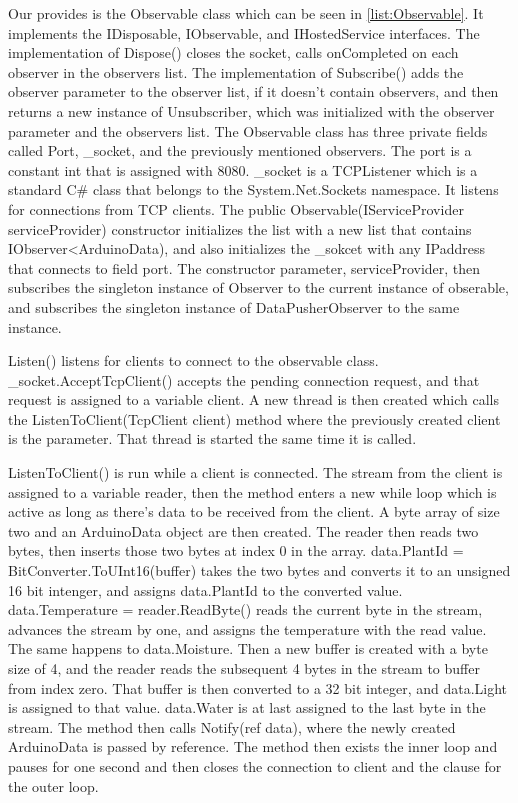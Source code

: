 \documentclass[a4paper,12pt,twoside,openright,titlepage]{book}
\begin{document}
Our provides is the Observable class which can be seen in \ref{list:Observable}. It implements the IDisposable, IObservable, and IHostedService interfaces. The implementation of Dispose() closes the socket, calls onCompleted on each observer in the observers list. The implementation of Subscribe() adds the observer parameter to the observer list, if it doesn't contain observers, and then returns a new instance of Unsubscriber, which was initialized with the observer parameter and the observers list. The Observable class has three private fields called Port, \_socket, and the previously mentioned observers. The port is a constant int that is assigned with 8080. \_socket is a TCPListener which is a standard C\# class that belongs to the System.Net.Sockets namespace. It listens for connections from TCP clients. The public Observable(IServiceProvider serviceProvider) constructor initializes the list with a new list that contains IObserver<ArduinoData), and also initializes the \_sokcet with any IPaddress that connects to field port. The constructor parameter, serviceProvider, then subscribes the singleton instance of Observer to the current instance of obserable, and subscribes the singleton instance of DataPusherObserver to the same instance.

Listen() listens for clients to connect to the observable class. \_socket.AcceptTcpClient() accepts the pending connection request, and that request is assigned to a variable client. A new thread is then created which calls the ListenToClient(TcpClient client) method where the previously created client is the parameter. That thread is started the same time it is called.

ListenToClient() is run while a client is connected. The stream from the client is assigned to a variable reader, then the method enters a new while loop which is active as long as there's data to be received from the client. A byte array of size two and an ArduinoData object are then created. The reader then reads two bytes, then inserts those two bytes at index 0 in the array. data.PlantId = BitConverter.ToUInt16(buffer) takes the two bytes and converts it to an unsigned 16 bit intenger, and assigns data.PlantId to the converted value. data.Temperature = reader.ReadByte() reads the current byte in the stream, advances the stream by one, and assigns the temperature with the read value. The same happens to data.Moisture. Then a new buffer is created with a byte size of 4, and the reader reads the subsequent 4 bytes in the stream to buffer from index zero. That buffer is then converted to a 32 bit integer, and data.Light is assigned to that value. data.Water is at last assigned to the last byte in the stream. The method then calls Notify(ref data), where the newly created ArduinoData is passed by reference. The method then exists the inner loop and pauses for one second and then closes the connection to client and the clause for the outer loop.
\end{document}
